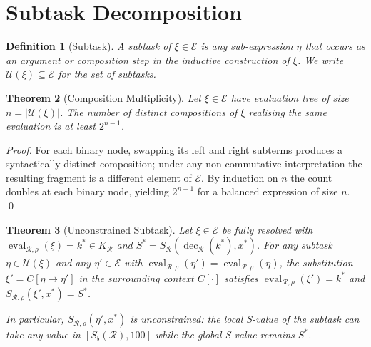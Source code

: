 \documentclass[twocolumn,a4paper]{article}
\newtheorem{theorem}{Theorem}[section]
\newtheorem{definition}[theorem]{Definition}
\DeclareMathOperator{\eval}{eval}
\DeclareMathOperator{\dec}{dec}
\newcommand{\Expr}{\mathcal{E}}
\newcommand{\Sub}{\mathcal{U}}
\newcommand{\receiver}{\mathcal{R}}
\newcommand{\Sscalar}{S}
\newcommand{\Sfloor}{S_{\flat}}
\begin{document}
\section{Subtask Decomposition}
\label{sec:subtask-decomposition}

\begin{definition}[Subtask]
\label{def:subtask}
A \emph{subtask} of $\xi\in\Expr$ is any sub-expression $\eta$ that occurs as an argument or composition step in the inductive construction of $\xi$. We write $\Sub(\xi)\subseteq\Expr$ for the set of subtasks.
\end{definition}

\begin{theorem}[Composition Multiplicity]
\label{thm:comp-mult}
Let $\xi\in\Expr$ have evaluation tree of size $n=|\Sub(\xi)|$. The number of distinct compositions of $\xi$ realising the same evaluation is at least $2^{n-1}$.
\end{theorem}

\begin{proof}
For each binary node, swapping its left and right subterms produces a syntactically distinct composition; under any non-commutative interpretation the resulting fragment is a different element of $\Expr$. By induction on $n$ the count doubles at each binary node, yielding $2^{n-1}$ for a balanced expression of size $n$. \qed
\end{proof}

\begin{theorem}[Unconstrained Subtask]
\label{thm:unconstrained-subtask}
Let $\xi\in\Expr$ be fully resolved with $\eval_{\receiver,\rho}(\xi)=k^{*}\in K_{\receiver}$ and $\Sscalar^{*}=\Sscalar_{\receiver}(\dec_{\receiver}(k^{*}),x^{*})$. For any subtask $\eta\in\Sub(\xi)$ and any $\eta'\in\Expr$ with $\eval_{\receiver,\rho}(\eta')=\eval_{\receiver,\rho}(\eta)$, the substitution $\xi'=C[\eta\mapsto\eta']$ in the surrounding context $C[\cdot]$ satisfies $\eval_{\receiver,\rho}(\xi')=k^{*}$ and $\Sscalar_{\receiver,\rho}(\xi',x^{*})=\Sscalar^{*}$.

In particular, $\Sscalar_{\receiver,\rho}(\eta',x^{*})$ is unconstrained: the local S-value of the subtask can take any value in $[\Sfloor(\receiver),100]$ while the global S-value remains $\Sscalar^{*}$.
\end{theorem}
\end{document}
